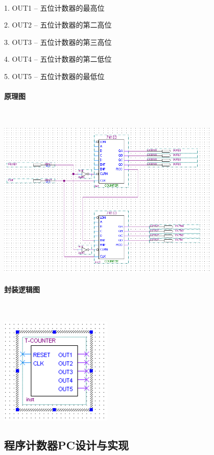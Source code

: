 \documentclass[UTF8]{ctexart}
\begin{document}
    ~

    1. OUT1  -- 五位计数器的最高位

    2. OUT2 -- 五位计数器的第二高位

    3. OUT3 -- 五位计数器的第三高位

    4. OUT4 -- 五位计数器的第二低位

    5. OUT5 -- 五位计数器的最低位

    \paragraph{原理图}

    ~

    \includegraphics[width=0.8\textwidth]{./img/T-COUNTER原理图.png}

    \paragraph{封装逻辑图}

    ~

    \includegraphics[width=0.4\textwidth]{./img/T-COUNTER封装逻辑图.png}

    \subsection{程序计数器PC设计与实现}
\end{document}
